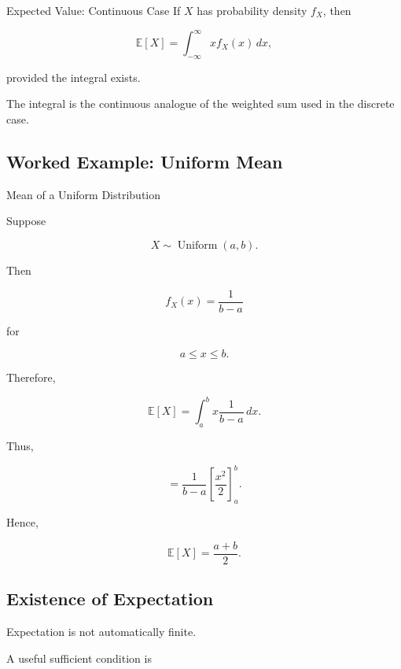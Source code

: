 \begin{definitionbox}{Expected Value: Continuous Case}
If \(X\) has probability density \(f_X\), then

\[
\boxed{
\mathbb{E}[X]
=
\int_{-\infty}^{\infty}
x f_X(x)\,dx,
}
\]

provided the integral exists.
\end{definitionbox}

The integral is the continuous analogue of the weighted sum used in the
discrete case.

\subsection{Worked Example: Uniform Mean}
\label{subsec:worked-uniform-mean}

\begin{workedexamplebox}{Mean of a Uniform Distribution}

Suppose

\[
X\sim\operatorname{Uniform}(a,b).
\]

Then

\[
f_X(x)
=
\frac1{b-a}
\]

for

\[
a\leq x\leq b.
\]

Therefore,

\[
\mathbb{E}[X]
=
\int_a^b
x\frac1{b-a}\,dx.
\]

Thus,

\[
=
\frac1{b-a}
\left[
\frac{x^2}{2}
\right]_a^b.
\]

Hence,

\begin{answerbox}
\[
\boxed{
\mathbb{E}[X]
=
\frac{a+b}{2}.
}
\]
\end{answerbox}

\end{workedexamplebox}

\subsection{Existence of Expectation}
\label{subsec:expectation-existence}

Expectation is not automatically finite.

A useful sufficient condition is


